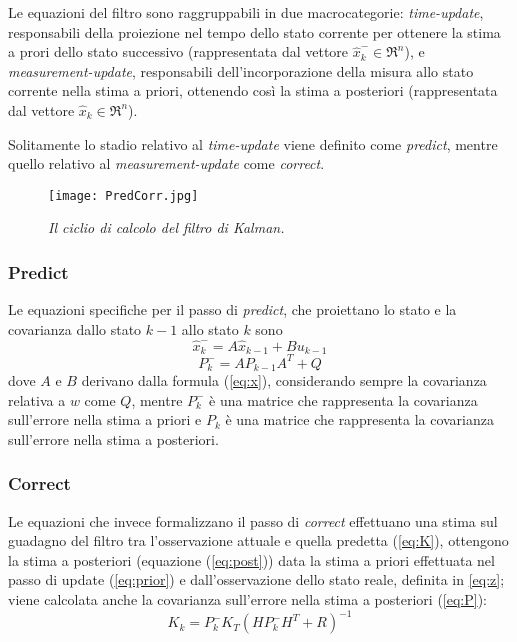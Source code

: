 Le equazioni del filtro sono raggruppabili in due macrocategorie: \textit{time-update}, responsabili della proiezione nel tempo dello stato corrente per ottenere la stima a prori dello stato successivo (rappresentata dal vettore $\hat{x}_k^- \in \Re^n$), e \textit{measurement-update}, responsabili dell'incorporazione della misura allo stato corrente nella stima a priori, ottenendo così la stima a posteriori (rappresentata dal vettore $\hat{x}_k \in \Re^n$). 

Solitamente lo stadio relativo al \textit{time-update} viene definito come \textit{predict}, mentre quello relativo al \textit{measurement-update} come \textit{correct}.

\begin{figure}[hb]
\centering
	\texttt{[image: PredCorr.jpg]}
\caption{\textit{Il ciclio di calcolo del filtro di Kalman.}\label{fig:predictcorrect}}
\end{figure}
\subsubsection{Predict}
Le equazioni specifiche per il passo di \textit{predict}, che proiettano lo stato e la covarianza dallo stato $k-1$ allo stato $k$ sono 
\begin{equation}\label{eq:prior}
\hat{x}_k^-=A \hat{x}_{k-1}+Bu_{k-1}
\end{equation} 
\begin{equation}
P_k^-=A P_{k-1}A^T+Q
\end{equation} 
dove $A$ e $B$ derivano dalla formula (\ref{eq:x}), considerando sempre la covarianza relativa a $w$ come $Q$, mentre $P_k^-$ è una matrice che rappresenta la covarianza sull'errore nella stima a priori e $P_k$ è una matrice che rappresenta la covarianza sull'errore nella stima a posteriori.
\subsubsection{Correct}

Le equazioni che invece formalizzano il passo di \textit{correct} effettuano una stima sul guadagno del filtro tra l'osservazione attuale e quella predetta (\ref{eq:K}), ottengono la stima a posteriori  (equazione (\ref{eq:post})) data la stima a priori effettuata nel passo di update (\ref{eq:prior}) e dall'osservazione dello stato reale, definita in \ref{eq:z}; viene calcolata anche la covarianza sull'errore nella stima a posteriori (\ref{eq:P}):
\begin{equation}\label{eq:K}
K_k = P_k^- K_T(HP_k^-H^T+R)^{-1}
\end{equation} 

